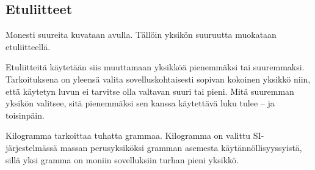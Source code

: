 \subsection*{Etuliitteet}

Monesti suureita kuvataan  avulla. Tällöin yksikön suuruutta muokataan etuliitteellä.



Etuliitteitä käytetään siis muuttamaan yksikköä pienemmäksi tai suuremmaksi. Tarkoituksena on yleensä valita sovelluskohtaisesti sopivan kokoinen yksikkö niin, että käytetyn luvun ei tarvitse olla valtavan suuri tai pieni. Mitä suuremman yksikön valitsee, sitä pienemmäksi sen kanssa käytettävä luku tulee -- ja toisinpäin.

\begin{esimerkki}
Kilogramma tarkoittaa tuhatta grammaa. Kilogramma on valittu SI-järjestelmässä massan perusyksiköksi gramman asemesta käytännöllisyyssyistä, sillä yksi gramma on moniin sovelluksiin turhan pieni yksikkö.
\end{esimerkki}

